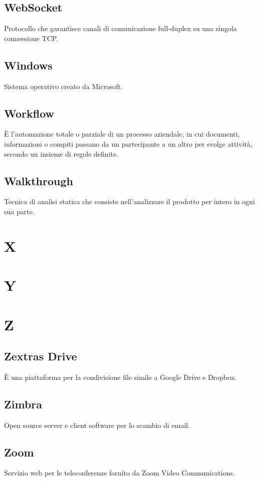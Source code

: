 \subsection{WebSocket} Protocollo che garantisce canali di comunicazione full-duplex su una singola connessione TCP.
\subsection{Windows} Sistema operativo creato da Microsoft.
\subsection{Workflow} È l’automazione totale o parziale di un processo aziendale, in cui documenti, informazioni o compiti passano da un partecipante a un altro per svolge attività, secondo un insieme di regole definite.
\subsection{Walkthrough} Tecnica di analisi statica che consiste nell’analizzare il prodotto per intero in ogni sua parte.
\newpage \section{X}
\newpage \section{Y}
\newpage \section{Z}
\subsection{Zextras Drive} È una piattaforma per la condivisione file simile a Google Drive e Dropbox.
\subsection{Zimbra} Open source server e client software per lo scambio di email.
\subsection{Zoom} Servizio web per le teleconferenze fornito da  Zoom Video Communications.